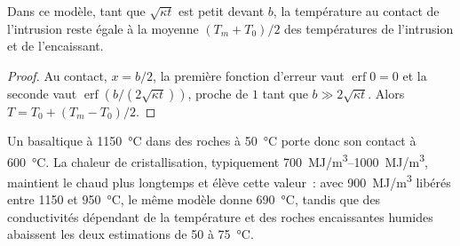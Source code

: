 \begin{proposition}\label{prop:b2:magma-emplacement:contact}
Dans ce modèle, tant que $\sqrt{\kappa t}$ est petit devant $b$, la
température au contact de l'intrusion reste égale à la moyenne $(T_m + T_0)/2$ des
températures de l'intrusion et de l'encaissant.
\end{proposition}

\begin{proof}
Au contact, $x = b/2$, la première fonction d'erreur vaut $\operatorname{erf}0 = 0$ et
la seconde vaut $\operatorname{erf}(b/(2\sqrt{\kappa t}))$, proche de $1$ tant que
$b \gg 2\sqrt{\kappa t}$. Alors $T = T_0 + (T_m - T_0)/2$.
\end{proof}

Un  basaltique à \qty{1150}{\celsius} dans des roches à \qty{50}{\celsius} porte donc son contact à
\qty{600}{\celsius}. La chaleur de cristallisation, typiquement
\qtyrange{700}{1000}{MJ/m^3}, maintient le  chaud plus longtemps et élève cette valeur~:
avec \qty{900}{MJ/m^3} libérés entre \num{1150} et \qty{950}{\celsius}, le même
modèle donne \qty{690}{\celsius}, tandis que des conductivités dépendant de la température et des
roches encaissantes humides abaissent les deux estimations de 50 à \qty{75}{\celsius}.

